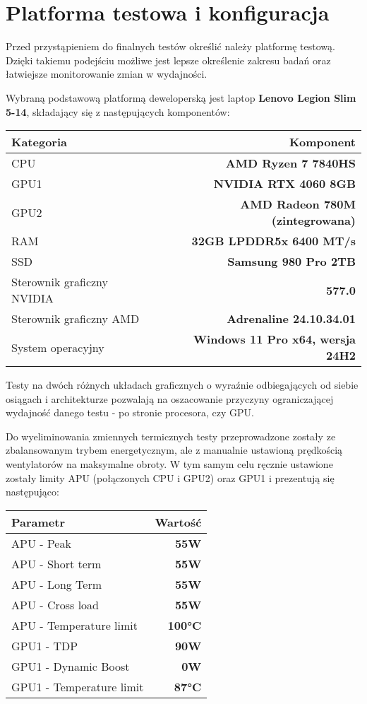 \chapter{Platforma testowa i konfiguracja}

Przed przystąpieniem do finalnych testów określić należy
platformę testową. Dzięki takiemu podejściu możliwe jest lepsze określenie zakresu
badań oraz łatwiejsze monitorowanie zmian w wydajności.

Wybraną podstawową platformą deweloperską jest laptop \textbf{Lenovo Legion Slim 5-14}, składający się z następujących komponentów:

\begin{center}
	\begin{tabular}{ |l r| }
		\hline
		\textbf{Kategoria} & \textbf{Komponent} \\
		\hline
		CPU & \textbf{AMD Ryzen 7 7840HS} \\
		GPU1 & \textbf{NVIDIA RTX 4060 8GB} \\
		GPU2 & \textbf{AMD Radeon 780M (zintegrowana)} \\
		RAM & \textbf{32GB LPDDR5x 6400 MT/s} \\
		SSD & \textbf{Samsung 980 Pro 2TB} \\
		Sterownik graficzny NVIDIA & \textbf{577.0} \\
		Sterownik graficzny AMD & \textbf{Adrenaline 24.10.34.01} \\
		System operacyjny & \textbf{Windows 11 Pro x64, wersja 24H2} \\
		\hline
	\end{tabular}
\end{center}

Testy na dwóch różnych układach graficznych o wyraźnie odbiegających od siebie osiągach i architekturze pozwalają na oszacowanie przyczyny ograniczającej wydajność danego testu - po stronie procesora, czy GPU.

Do wyeliminowania zmiennych termicznych testy przeprowadzone zostały ze zbalansowanym trybem energetycznym, ale z manualnie ustawioną prędkością wentylatorów na maksymalne obroty. W tym samym celu ręcznie ustawione zostały limity APU (połączonych CPU i GPU2) oraz GPU1 i prezentują się następująco:

\begin{center}
	\begin{tabular}{ |l r| }
		\hline
		\textbf{Parametr} & \textbf{Wartość} \\
		\hline
		APU - Peak & \textbf{55W} \\
		APU - Short term & \textbf{55W} \\
		APU - Long Term & \textbf{55W} \\
		APU - Cross load & \textbf{55W} \\
		APU - Temperature limit & \textbf{100°C} \\
		GPU1 - TDP & \textbf{90W} \\
		GPU1 - Dynamic Boost & \textbf{0W} \\
		GPU1 - Temperature limit & \textbf{87°C} \\
		\hline
	\end{tabular}
\end{center}


